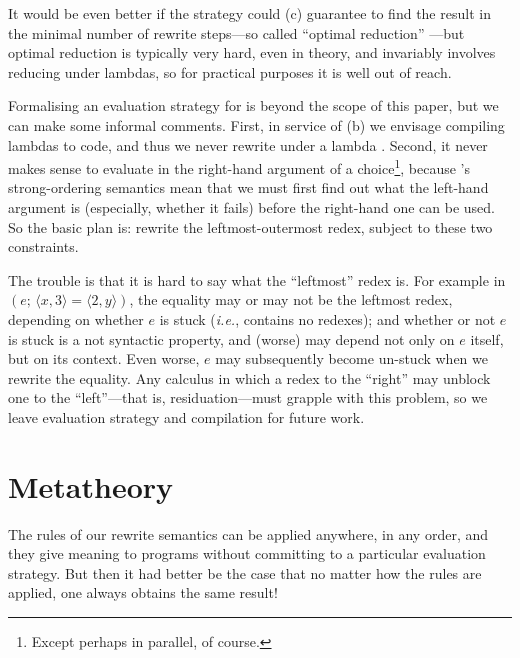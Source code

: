 \documentclass[acmsmall,review,anonymous,dvipsnames]{acmart}
\newcommand{\Varid}[1]{\mathit{#1}}
\newcommand{\ie}{\emph{i.e.}}	%
\begin{document}
It would be even better if the strategy could (c) guarantee to find the
result in the minimal number of rewrite steps---so called ``optimal reduction'' \cite{levy1978reductions,lamping1989algorithm,asperti1998optimal}---but optimal reduction is typically very hard, even in theory, and
invariably involves reducing under lambdas, so for practical purposes it is well out of reach.

Formalising an evaluation strategy for \versecalc{} is beyond the scope of this paper, but
we can make some informal comments.  First, in service of (b) we envisage compiling
lambdas to code, and thus we never rewrite under a lambda \cite{pj-book}.
Second, it never makes sense to evaluate in the right-hand argument of
a choice\footnote{Except perhaps in parallel, of course.}, because
\versecalc{}'s strong-ordering semantics mean that we must first find out what the left-hand argument
is (especially, whether it fails) before the right-hand one can be used.
So the basic plan is: rewrite the leftmost-outermost redex, subject to these two constraints.

The trouble is that it is hard to say what the ``leftmost'' redex is.  For example in \ensuremath{(\Varid{e};\,\langle{}\Varid{x},\mathrm{3}\rangle\mathrel{=}\langle{}\mathrm{2},\Varid{y}\rangle)},
the equality may or may not be the leftmost redex, depending on whether \ensuremath{\Varid{e}} is stuck ({\ie}, contains no
redexes); and whether or not \ensuremath{\Varid{e}} is stuck is a not syntactic property, and
(worse) may depend not only on \ensuremath{\Varid{e}} itself, but on its context. Even worse, \ensuremath{\Varid{e}} may subsequently
become un-stuck when we rewrite the equality.
Any calculus in which a redex to the ``right'' may unblock one to the
``left''---that is, residuation---must grapple with this problem,
so we leave evaluation strategy and compilation for future work.

\newcommand{\circlednum}[1]{\raisebox{.5pt}{\textcircled{\raisebox{-.9pt} {#1}}}}
\newcommand{\xmovesto}{\hspace{-2mm}\movesto\hspace{-2mm}}



\section{Metatheory} \label{sec:metatheory}  \label{sec:confluence}

The rules of our rewrite semantics can be applied anywhere,
in any order, and they give meaning to programs without
committing to a particular evaluation strategy.
%
But then it had better be the case that no matter how the
rules are applied, one always obtains the same result!
\end{document}
